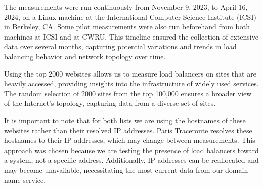\documentclass[12pt]{cwru_thesis}
\begin{document}
The measurements were run continuously from November 9, 2023, to April 16, 2024, on a Linux machine at the International Computer Science Institute (ICSI) in Berkeley, CA. Some pilot measurements were also run beforehand from both machines at ICSI and at CWRU.
This timeline ensured the collection of extensive data over several months, capturing potential variations and trends in load balancing behavior and network topology over time. 

Using the top 2000 websites allows us to measure load balancers on sites that are heavily accessed, providing insights into the infrastructure of widely used services. The random selection of 2000 sites from the top 100,000 ensures a broader view of the Internet's topology, capturing data from a diverse set of sites.

It is important to note that for both lists we are using the hostnames of these websites rather than their resolved IP addresses. Paris Traceroute resolves these hostnames to their IP addresses, which may change between measurements. This approach was chosen because we are testing the presence of load balancers toward a system, not a specific address. Additionally, IP addresses can be reallocated and may become unavailable, necessitating the most current data from our domain name service.


\end{document}
